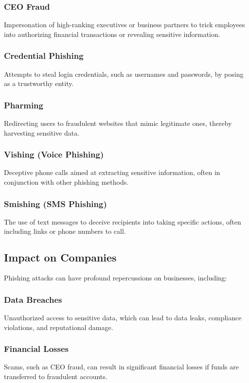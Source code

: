 \documentclass[conference]{IEEEtran}
\begin{document}
\subsubsection{CEO Fraud}
Impersonation of high-ranking executives or business partners to trick employees into authorizing financial transactions or revealing sensitive information.

\subsubsection{Credential Phishing}
Attempts to steal login credentials, such as usernames and passwords, by posing as a trustworthy entity.

\subsubsection{Pharming}
Redirecting users to fraudulent websites that mimic legitimate ones, thereby harvesting sensitive data.

\subsubsection{Vishing (Voice Phishing)}
Deceptive phone calls aimed at extracting sensitive information, often in conjunction with other phishing methods.

\subsubsection{Smishing (SMS Phishing)}
The use of text messages to deceive recipients into taking specific actions, often including links or phone numbers to call.

\subsection{Impact on Companies}
Phishing attacks can have profound repercussions on businesses, including:
\subsubsection{Data Breaches}
Unauthorized access to sensitive data, which can lead to data leaks, compliance violations, and reputational damage.

\subsubsection{Financial Losses}
Scams, such as CEO fraud, can result in significant financial losses if funds are transferred to fraudulent accounts.
\end{document}
